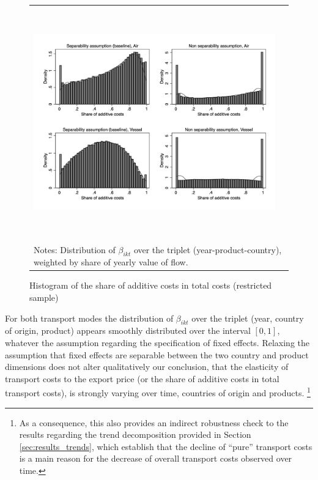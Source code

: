 \documentclass[a4paper,11pt]{article}
\begin{document}
\begin{figure}[htbp]
\caption{Histogram of the share of additive costs in total costs (restricted sample)}
\label{fig:histogram_beta_robustness}
\begin{center}
\begin{tabular}{cc}
\includegraphics[width=14cm, height=10cm]{Etude_beta_pond.jpg}\\
\multicolumn{2}{l}{{\footnotesize Notes: Distribution of $\beta_{ikt}$ over the triplet (year-product-country), weighted by share of yearly value of flow.}}\\
\end{tabular}
\end{center}
\end{figure}

For both transport modes the distribution of $\beta_{ikt}$ over the triplet (year, country of origin, product) appears smoothly distributed over the interval $[0,1]$, whatever the assumption regarding the specification of fixed effects.
Relaxing the assumption that fixed effects are separable between the two country and product dimensions does not alter qualitatively our conclusion, that the elasticity of transport costs to the export price (or the share of additive costs in total transport costs), is strongly varying over time, countries of origin and products.
\footnote{As a consequence, this also provides an indirect robustness check to the results regarding the trend decomposition provided in Section \ref{sec:results_trends}, which establish that the decline of ``pure'' transport costs is a main reason for the decrease of overall transport costs observed over time.}
\end{document}
